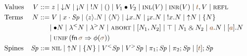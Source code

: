 \begin{align*}
& \mbox{Values} &
V & ::= z                     %
   \mid \tdownr{N}            %
   \mid \tgnabr{N}            %
   \mid \tbangr{N}            %
%
   \mid \toner
   \mid \tfuser{V_1}{V_2}     %
%  
   \mid \tinl{V}
   \mid \tinr{V}
   \mid \texistsr{\lf t}{V}
   \mid \tunifr
 \\
& \mbox{Terms} &
N & ::= \tfocusr{V}           %
   \mid \tfocusl{x}{\Sp}      %
   \mid \tetap{z}{N}          %
   \mid \tetan{N}             %
   \mid \tdownl{x}{N}         %
   \mid \tgnabl{x}{N}         %
   \mid \tbangl{x}{N}         %
   \mid \tupr{N}              %
   \mid \tlaxr{N}             %
\\ & & & ~~~~ %
   \mid \tfusel{N}            %
   \mid \tlaml{N}             %
   \mid \tlamr{N}             %
%
   \mid \tabort
   \mid \toplusl{N_1}{N_2}    %
   \mid \ttopr 
   \mid \twithr{N_1}{N_2}     %
   \mid \texistsl{\lf a}{N}
   \mid \tforallr{\lf a}{N}
\\ & & & ~~~~ %
   \mid {\textsc{unif}}\,({\sf fn}\,\lf{\sigma} \Rightarrow \phi(\lf\sigma))
\\
& \mbox{Spines} &
\Sp & ::= \tnil               %
   \mid \tupl{N}              %
   \mid \tlaxl{N}             %
   \mid \tappl{V}{\Sp}        %
   \mid \tappr{V}{\Sp}        %
   \mid \tpione{\Sp}          %
   \mid \tpitwo{\Sp}          %
   \mid \tforalll{\lf t}{\Sp}
\end{align*}

